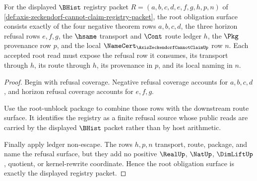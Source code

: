 \begin{theorem}
\label{thm:axis-zeckendorf-cannot-claim-root-obligation-surface}
For the displayed $\BHist$ registry packet $R=(a,b,c,d,e,f,g,h,p,n)$ of \autoref{def:axis-zeckendorf-cannot-claim-registry-packet}, the root obligation surface consists exactly of the four negative theorem rows $a,b,c,d$, the three horizon refusal rows $e,f,g$, the $\hsame$ transport and $\Cont$ route ledger $h$, the $\Pkg$ provenance row $p$, and the local $\NameCert_{\AxisZeckendorfCannotClaimUp}$ row $n$. Each accepted root read must expose the refusal row it consumes, its transport through $h$, its route through $h$, its provenance in $p$, and its local naming in $n$.
\end{theorem}
\begin{proof}
Begin with refusal coverage. Negative refusal coverage accounts for $a,b,c,d$, and horizon refusal coverage accounts for $e,f,g$.

Use the root-unblock package to combine those rows with the downstream route surface. It identifies the registry as a finite refusal source whose public reads are carried by the displayed $\BHist$ packet rather than by host arithmetic.

Finally apply ledger non-escape. The rows $h,p,n$ transport, route, package, and name the refusal surface, but they add no positive $\RealUp$, $\NatUp$, $\DimLiftUp$, quotient, or kernel-rewrite coordinate. Hence the root obligation surface is exactly the displayed registry packet.
\end{proof}

